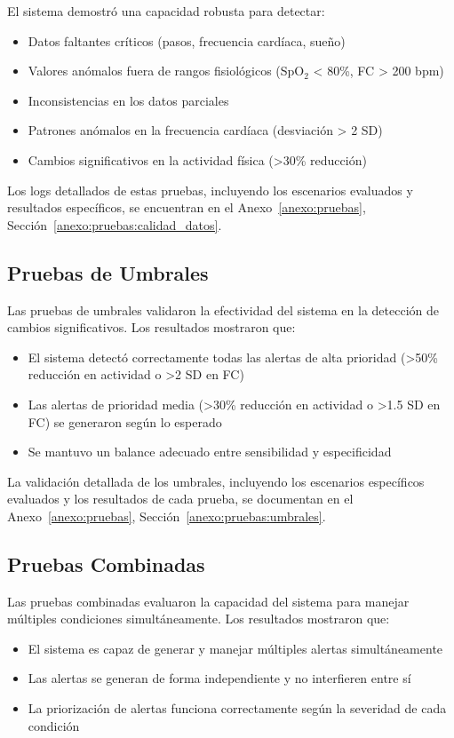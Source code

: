 El sistema demostró una capacidad robusta para detectar:
\begin{itemize}
    \item Datos faltantes críticos (pasos, frecuencia cardíaca, sueño)
    \item Valores anómalos fuera de rangos fisiológicos (SpO$_2$ < 80\%, FC > 200 bpm)
    \item Inconsistencias en los datos parciales
    \item Patrones anómalos en la frecuencia cardíaca (desviación > 2 SD)
    \item Cambios significativos en la actividad física (>30\% reducción)
\end{itemize}

Los logs detallados de estas pruebas, incluyendo los escenarios evaluados y resultados específicos, se encuentran en el Anexo~\ref{anexo:pruebas}, Sección~\ref{anexo:pruebas:calidad_datos}.

\subsection{Pruebas de Umbrales}
Las pruebas de umbrales validaron la efectividad del sistema en la detección de cambios significativos. Los resultados mostraron que:

\begin{itemize}
    \item El sistema detectó correctamente todas las alertas de alta prioridad (>50\% reducción en actividad o >2 SD en FC)
    \item Las alertas de prioridad media (>30\% reducción en actividad o >1.5 SD en FC) se generaron según lo esperado
    \item Se mantuvo un balance adecuado entre sensibilidad y especificidad
\end{itemize}

La validación detallada de los umbrales, incluyendo los escenarios específicos evaluados y los resultados de cada prueba, se documentan en el Anexo~\ref{anexo:pruebas}, Sección~\ref{anexo:pruebas:umbrales}.

\subsection{Pruebas Combinadas}
Las pruebas combinadas evaluaron la capacidad del sistema para manejar múltiples condiciones simultáneamente. Los resultados mostraron que:

\begin{itemize}
    \item El sistema es capaz de generar y manejar múltiples alertas simultáneamente
    \item Las alertas se generan de forma independiente y no interfieren entre sí
    \item La priorización de alertas funciona correctamente según la severidad de cada condición
\end{itemize}

